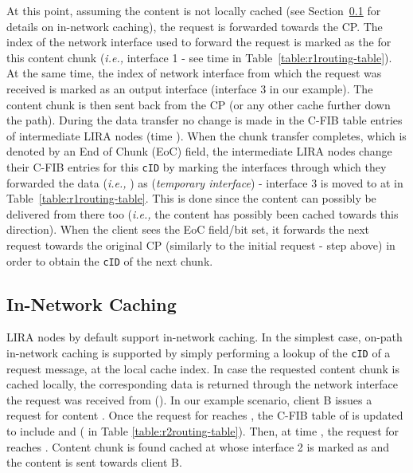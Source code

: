 \documentclass{sig-alternate}
\newcommand*\circled[1]{\tikz[baseline=(char.base)]{
            \node[shape=circle,draw,inner sep=2pt] (char) {#1};}}
\newcommand{\ie}{{\em i.e.,\/ }}
\begin{document}
At this point, assuming the content is not locally cached (see Section~\ref{caching} for details on in-network caching), the request is forwarded towards the CP. The index of the network interface used to forward the request is marked as the  for this content chunk (\ie interface 1 - see time  in Table~\ref{table:r1routing-table}). At the same time, the index of network interface from which the request was received is marked as an output interface (interface 3 in our example). The content chunk is then sent back from the CP (or any other cache further down the path). During the data transfer no change is made in the C-FIB table entries of intermediate LIRA nodes (time ). When the chunk transfer completes, which is denoted by an End of Chunk (EoC) field, the intermediate LIRA nodes change their C-FIB entries for this \texttt{cID} by marking the interfaces through which they forwarded the data (\ie ) as  (\textit{temporary interface}) - interface 3 is moved to  at  in Table~\ref{table:r1routing-table}. This is done since the content can possibly be delivered from there too (\ie the content has possibly been cached towards this direction).
When the client sees the EoC field/bit set, it forwards the next request towards the original CP (similarly to the initial request - step \circled{3} above) in order to obtain the \texttt{cID} of the next chunk.




\subsection{In-Network Caching}\label{caching}

LIRA nodes by default support in-network caching. In the simplest case, on-path in-network caching is supported by simply performing a lookup of the \texttt{cID} of a request message, at the local cache index. In case the requested content chunk is cached locally, the corresponding data is returned through the network interface the request was received from (). In our example scenario, client B issues a request for content . Once the request for  reaches , the C-FIB table of  is updated to include  and  ( in Table \ref{table:r2routing-table}). Then, at time , the request for  reaches . Content chunk  is found cached at  whose interface 2 is marked as  and the content is sent towards client B.
\end{document}
